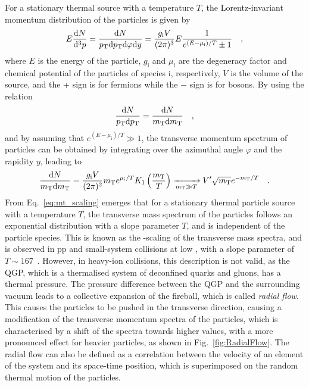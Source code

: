 For a stationary thermal source with a temperature $T$, the Lorentz-invariant momentum distribution of the particles is given by
\begin{equation*}
    E\frac{\mathrm{d} N}{\mathrm{d}^3p} = \frac{\mathrm{d} N}{p\mathrm{_T}\mathrm{d}p\mathrm{_T}\mathrm{d}\varphi\mathrm{d} y} = \frac{g_\mathrm{i}V}{(2\pi)^3} E \frac{1}{e^{(E-\mu_\mathrm{i})/T}\pm1}\quad ,
\end{equation*}
where $E$ is the energy of the particle, $g_\mathrm{i}$ and $\mu_\mathrm{i}$ are the degeneracy factor and chemical potential of the particles of species i, respectively, $V$ is the volume of the source, and the + sign is for fermions while the $-$ sign is for bosons. By using the relation
\begin{equation*}
  \frac{\mathrm{d} N}{p\mathrm{_T}\mathrm{d}p\mathrm{_T}} = \frac{\mathrm{d} N}{m_\mathrm{T}\mathrm{d}m_\mathrm{T}}\quad ,
\end{equation*}
and by assuming that $e^{(E-\mu_\mathrm{i})/T}\gg1$, the transverse momentum spectrum of particles can be obtained by integrating over the azimuthal angle $\varphi$ and the rapidity $y$, leading to
\begin{equation}\label{eq:mt_scaling}
    \frac{\mathrm{d} N}{m_\mathrm{T}\mathrm{d}m_\mathrm{T}} = \frac{g_\mathrm{i}V}{(2\pi)^2} m_\mathrm{T} e^{\mu_\mathrm{i}/T} K_1\left(\frac{m_\mathrm{T}}{T}\right) \xrightarrow[m_\mathrm{T}\gg T]{} V'\sqrt{m_\mathrm{T}}e^{-m_\mathrm{T}/T}\quad .
\end{equation}
From Eq.~\ref{eq:mt_scaling} emerges that for a stationary thermal particle source with a temperature $T$, the transverse mass spectrum of the particles follows an exponential distribution with a slope parameter $T$, and is independent of the particle species. This is known as the \mt-scaling of the transverse mass spectra, and is observed in pp and small-system collisions at low \sqs, with a slope parameter of $T\sim167$~\mev. However, in heavy-ion collisions, this description is not valid, as the QGP, which is a thermalised system of deconfined quarks and gluons, has a thermal pressure. The pressure difference between the QGP and the surrounding vacuum leads to a collective expansion of the fireball, which is called \emph{radial flow}. This causes the particles to be pushed in the transverse direction, causing a modification of the transverse momentum spectra of the particles, which is characterised by a shift of the spectra towards higher \pt values, with a more pronounced effect for heavier particles, as shown in Fig.~\ref{fig:RadialFlow}. The radial flow can also be defined as a correlation between the velocity of an element of the system and its space-time position, which is superimposed on the random thermal motion of the particles.

